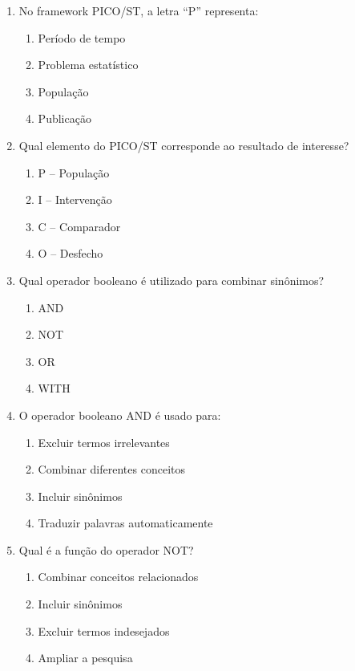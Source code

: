 \documentclass[12pt,a4paper]{article}
\begin{document}
\begin{enumerate}[label=\textbf{\arabic*.}]
\item No framework PICO/ST, a letra ``P'' representa:
\begin{enumerate}[label=\alph*)]
    \item Período de tempo
    \item Problema estatístico
    \item População
    \item Publicação
\end{enumerate}

\item Qual elemento do PICO/ST corresponde ao resultado de interesse?
\begin{enumerate}[label=\alph*)]
    \item P – População
    \item I – Intervenção
    \item C – Comparador
    \item O – Desfecho
\end{enumerate}

\item Qual operador booleano é utilizado para combinar sinônimos?
\begin{enumerate}[label=\alph*)]
    \item AND
    \item NOT
    \item OR
    \item WITH
\end{enumerate}

\item O operador booleano AND é usado para:
\begin{enumerate}[label=\alph*)]
    \item Excluir termos irrelevantes
    \item Combinar diferentes conceitos
    \item Incluir sinônimos
    \item Traduzir palavras automaticamente
\end{enumerate}

\item Qual é a função do operador NOT?
\begin{enumerate}[label=\alph*)]
    \item Combinar conceitos relacionados
    \item Incluir sinônimos
    \item Excluir termos indesejados
    \item Ampliar a pesquisa
\end{enumerate}


\end{enumerate}
\end{document}
